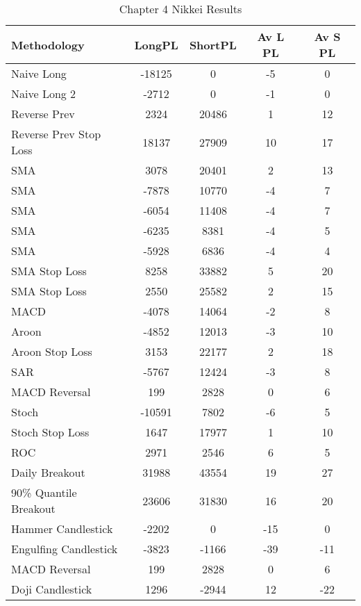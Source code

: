 \begin{table}[ht]
\centering
\caption[Chapter 4 Nikkei Results]{Chapter 4 Nikkei Results} 
\label{tab:chp6:nik_summary}
\begin{tabular}{lcccc}
  \toprule Methodology & LongPL & ShortPL & Av L PL & Av S PL \\ 
  \midrule Naive Long & -18125 & 0 & -5 & 0 \\ 
  Naive Long 2 & -2712 & 0 & -1 & 0 \\ 
  Reverse Prev & 2324 & 20486 & 1 & 12 \\ 
  Reverse Prev Stop Loss & 18137 & 27909 & 10 & 17 \\ 
  SMA & 3078 & 20401 & 2 & 13 \\ 
  SMA & -7878 & 10770 & -4 & 7 \\ 
  SMA & -6054 & 11408 & -4 & 7 \\ 
  SMA & -6235 & 8381 & -4 & 5 \\ 
  SMA & -5928 & 6836 & -4 & 4 \\ 
  SMA Stop Loss & 8258 & 33882 & 5 & 20 \\ 
  SMA Stop Loss & 2550 & 25582 & 2 & 15 \\ 
  MACD & -4078 & 14064 & -2 & 8 \\ 
  Aroon & -4852 & 12013 & -3 & 10 \\ 
  Aroon Stop Loss & 3153 & 22177 & 2 & 18 \\ 
  SAR & -5767 & 12424 & -3 & 8 \\ 
  MACD Reversal & 199 & 2828 & 0 & 6 \\ 
  Stoch & -10591 & 7802 & -6 & 5 \\ 
  Stoch Stop Loss & 1647 & 17977 & 1 & 10 \\ 
  ROC & 2971 & 2546 & 6 & 5 \\ 
  Daily Breakout & 31988 & 43554 & 19 & 27 \\ 
  90\% Quantile Breakout & 23606 & 31830 & 16 & 20 \\ 
  Hammer Candlestick & -2202 & 0 & -15 & 0 \\ 
  Engulfing Candlestick & -3823 & -1166 & -39 & -11 \\ 
  MACD Reversal & 199 & 2828 & 0 & 6 \\ 
  Doji Candlestick & 1296 & -2944 & 12 & -22 \\ 
   \bottomrule \end{tabular}
\end{table}
